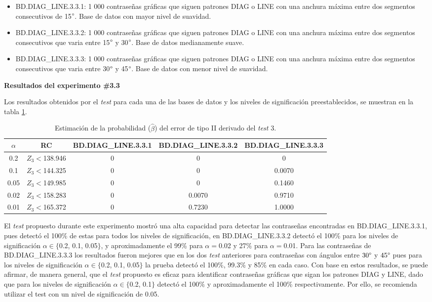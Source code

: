 \documentclass[12pt]{report}
\begin{document}
\begin{itemize}
	\item BD.DIAG\_LINE.3.3.1: 1 000 contraseñas gráficas que siguen patrones DIAG o LINE con una anchura máxima entre dos segmentos consecutivos de 15$\degree$. Base de datos con mayor nivel de suavidad. 
	\item BD.DIAG\_LINE.3.3.2: 1 000 contraseñas gráficas que siguen patrones DIAG o LINE con una anchura máxima entre dos segmentos consecutivos que varia entre 15$\degree$ y 30$\degree$. Base de datos medianamente suave.
	\item BD.DIAG\_LINE.3.3.3: 1 000 contraseñas gráficas que siguen patrones DIAG o LINE con una anchura máxima entre dos segmentos consecutivos que varia entre 30$\degree$ y 45$\degree$. Base de datos con menor nivel de suavidad.
\end{itemize}
\textbf{Resultados del experimento \#3.3}

Los resultados obtenidos por el \textit{test}  para cada una de las bases de datos y los  niveles de significación preestablecidos, se muestran en la tabla \ref{tab3:error2-prob1}.

\begin{table}[h!]
	\centering
	\begin{tabular}{|c|c|ccc|}
		\hline
		$\alpha$&RC  &BD.DIAG\_LINE.3.3.1 & BD.DIAG\_LINE.3.3.2 & BD.DIAG\_LINE.3.3.3  \\
		\hline
		0.2 & $Z_3<$138.946  &0     & 0          & 0     \\
		0.1 & $Z_3<$144.325 &0     & 0          & 0.0070     \\
		0.05 &$Z_3<$149.985 &0     & 0   		& 0.1460    \\
		0.02 &$Z_3<$158.283 &0     & 0.0070   & 0.9710     \\
		0.01 &$Z_3<$165.372 &0     & 0.7230    & 1.0000     \\
		\hline
	\end{tabular}
	\caption{Estimación de la probabilidad ($\hat{\beta}$) del error de tipo II derivado del \textit{test} 3.}
	\label{tab3:error2-prob1}
\end{table}
El \textit{test} propuesto durante este experimento mostró una alta capacidad para detectar las contraseñas encontradas en BD.DIAG\_LINE.3.3.1, pues detectó el 100\% de estas para todos los niveles de significación, en BD.DIAG\_LINE.3.3.2 detectó el 100\% para los niveles de significación $\alpha \in \{$0.2, 0.1, 0.05$\}$, y aproximadamente el 99\% para $\alpha=$0.02 y 27\% para $\alpha=$0.01. Para las contraseñas de BD.DIAG\_LINE.3.3.3 los resultados fueron mejores que en los dos \textit{test} anteriores para contraseñas con ángulos entre $30\degree$ y $45\degree$  pues para los niveles de significación $\alpha \in \{$0.2, 0.1, 0.05$\}$ la prueba detectó el 100\%, 99.3\% y 85\% en cada caso. Con base en estos resultados, se puede afirmar, de manera general, que el \textit{test} propuesto es eficaz para identificar contraseñas gráficas que sigan los patrones DIAG y LINE, dado que para los niveles de significación  $\alpha \in \{$0.2, 0.1$\}$ detectó el 100\% y aproximadamente el 100\% respectivamente.  Por ello, se recomienda utilizar el test con un nivel de significación de 0.05.
\end{document}
